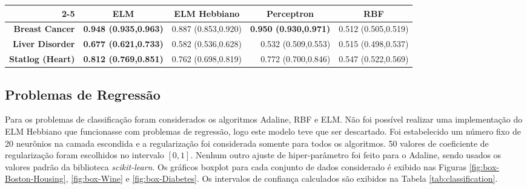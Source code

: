 \documentclass[conference]{IEEEtran}
\begin{document}
	\begin{table*}[thpbh]
		\caption{Intervalos de confiança de 95\% calculados para a AUC média}
		\label{tab:classification}
		\centering
		\begin{tabular}{r|r|r|r|r|}
			\cline{2-5}
			\multicolumn{1}{l|}{}                          & \multicolumn{1}{c|}{\textbf{ELM}} & \multicolumn{1}{c|}{\textbf{ELM Hebbiano}} & \multicolumn{1}{c|}{\textbf{Perceptron}} & \multicolumn{1}{c|}{\textbf{RBF}} \\ \hline
			\multicolumn{1}{|r|}{\textbf{Breast Cancer}}   & \textbf{0.948 (0.935,0.963)}         & 0.887 (0.853,0.920)                           & \textbf{0.950 (0.930,0.971)}                & 0.512 (0.505,0.519)                  \\ \hline
			\multicolumn{1}{|r|}{\textbf{Liver Disorder}}  & \textbf{0.677 (0.621,0.733)}         & 0.582 (0.536,0.628)                           & 0.532 (0.509,0.553)                         & 0.515 (0.498,0.537)                  \\ \hline
			\multicolumn{1}{|r|}{\textbf{Statlog (Heart)}} & \textbf{0.812 (0.769,0.851)}         & 0.762 (0.698,0.819)                           & 0.772 (0.700,0.846)                         & 0.547 (0.522,0.569)                  \\ \hline
		\end{tabular}
	\end{table*}

	\subsection{Problemas de Regressão}
	Para os problemas de classificação foram considerados os algoritmos Adaline, RBF e ELM. Não foi possível realizar uma implementação do ELM Hebbiano que funcionasse com problemas de regressão, logo este modelo teve que ser descartado. Foi estabelecido um número fixo de 20 neurônios na camada escondida e a regularização foi considerada somente para todos os algoritmos. 50 valores de coeficiente de regularização foram escolhidos no intervalo $[0,1]$. Nenhum outro ajuste de hiper-parâmetro foi feito para o Adaline, sendo usados os valores padrão da biblioteca \textit{scikit-learn}. Os gráficos boxplot para cada conjunto de dados considerado é exibido nas Figuras \ref{fig:box-Boston-Housing}, \ref{fig:box-Wine} e \ref{fig:box-Diabetes}.  Os intervalos de confiança calculados são exibidos na Tabela \ref{tab:classification}.
\end{document}
